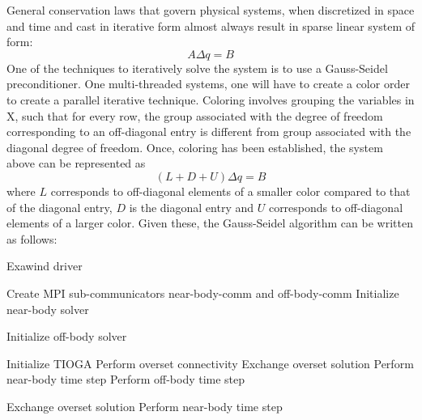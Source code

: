\documentclass[10pt]{article}
\begin{document}
General conservation laws that govern physical systems, when
discretized in space and time and cast in iterative form almost
always result in sparse linear system of form:
\begin{equation}
  A \Delta q = B
\end{equation}
One of the techniques to iteratively solve the system is to use a
Gauss-Seidel preconditioner. One multi-threaded systems, one will
have to create a color order to create a parallel iterative
technique. Coloring involves grouping the variables in X, such that
for every row, the group associated with the degree of freedom
corresponding to an off-diagonal entry is different from
group associated with the diagonal degree of freedom.
Once, coloring has been established, the system above can be
represented as
\begin{equation}
  (L+D+U) \Delta q = B
\end{equation}
where $L$ corresponds to off-diagonal elements of a smaller color
compared to that of the diagonal entry, $D$ is the diagonal entry
and $U$ corresponds to off-diagonal elements of a larger color.
Given these, the Gauss-Seidel algorithm can be written as follows:
\begin{algorithm}
\caption{Exawind driver}
\label{alg:driver}
\begin{algorithmic}[1]

\State Create MPI sub-communicators near-body-comm and off-body-comm
        \State Initialize near-body solver 
\EndIf

    \State Initialize off-body solver 
\EndIf

\State Initialize TIOGA 
 
        \State Perform overset connectivity
        \EndIf
        \State Exchange overset solution
          
        \State Perform near-body time step
     \EndFor
     \State Perform off-body time step 

        \State Exchange overset solution
         
                \State Perform near-body time step
        \EndFor
        \EndIf

\EndFor
\end{algorithmic}
\end{algorithm}
\end{document}
